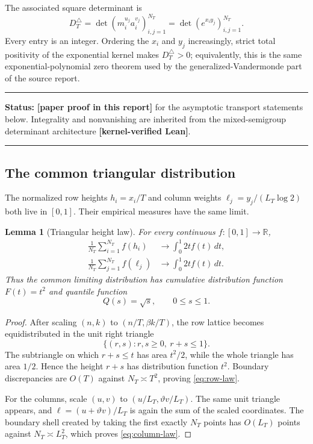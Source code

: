 \documentclass[11pt,oneside]{article}
\newtheorem{lemma}[theorem]{Lemma}
\theoremstyle{definition}
\theoremstyle{remark}
\newcommand{\R}{\mathbb R}
\newcommand{\statuslean}{\textcolor{leanblue}{\textbf{[kernel-verified Lean]}}}
\newcommand{\statusnew}{\textcolor{newgreen}{\textbf{[paper proof in this report]}}}
\newenvironment{statusbox}[1]
{\begin{center}\begin{minipage}{0.94\textwidth}\raggedright\hbadness=10000\hrule
\vspace{0.45em}\textbf{Status:} #1\par\vspace{0.35em}}
{\vspace{0.35em}\hrule\end{minipage}\end{center}}
\begin{document}
The associated square determinant is
\begin{equation}\label{eq:grid-determinant}
 D_T^{\triangle}
 =\det\!\left(m_i^{u_j}a_i^{v_j}\right)_{i,j=1}^{N_T}
 =\det\!\left(e^{x_i y_j}\right)_{i,j=1}^{N_T}.
\end{equation}
Every entry is an integer.  Ordering the $x_i$ and $y_j$ increasingly, strict total positivity
of the exponential kernel makes $D_T^{\triangle}>0$; equivalently, this is the same
exponential-polynomial zero theorem used by the generalized-Vandermonde part of the source
report.

\begin{statusbox}{\statusnew{} for the asymptotic transport statements below.  Integrality and
nonvanishing are inherited from the mixed-semigroup determinant architecture
\statuslean.}
\end{statusbox}

\subsection{The common triangular distribution}

The normalized row heights $h_i=x_i/T$ and column weights $\ell_j=y_j/(L_T\log2)$ both live in
$[0,1]$.  Their empirical measures have the same limit.

\begin{lemma}[Triangular height law]\label{lem:triangular-law}
For every continuous $f:[0,1]\to\R$,
\begin{align}
 \frac1{N_T}\sum_{i=1}^{N_T}f(h_i)
   &\longrightarrow \int_0^1 2t f(t)\,dt, \label{eq:row-law}\\
 \frac1{N_T}\sum_{j=1}^{N_T}f(\ell_j)
   &\longrightarrow \int_0^1 2t f(t)\,dt. \label{eq:column-law}
\end{align}
Thus the common limiting distribution has cumulative distribution function $F(t)=t^2$ and
quantile function
\begin{equation}\label{eq:triangular-quantile}
 Q(s)=\sqrt s,\qquad 0\le s\le1.
\end{equation}
\end{lemma}

\begin{proof}
After scaling $(n,k)$ to $(n/T,\beta k/T)$, the row lattice becomes equidistributed in the
unit right triangle
\[
 \{(r,s):r,s\ge0,\ r+s\le1\}.
\]
The subtriangle on which $r+s\le t$ has area $t^2/2$, while the whole triangle has area
$1/2$.  Hence the height $r+s$ has distribution function $t^2$.  Boundary discrepancies are
$O(T)$ against $N_T\asymp T^2$, proving \eqref{eq:row-law}.

For the columns, scale $(u,v)$ to $(u/L_T,\vartheta v/L_T)$.  The same unit triangle appears,
and $\ell=(u+\vartheta v)/L_T$ is again the sum of the scaled coordinates.  The boundary shell
created by taking the first exactly $N_T$ points has $O(L_T)$ points against
$N_T\asymp L_T^2$, which proves \eqref{eq:column-law}.
\end{proof}
\end{document}
